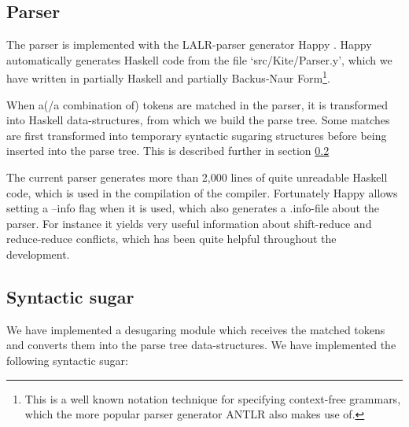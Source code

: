 \subsection{Parser}
The parser is implemented with the LALR-parser generator Happy \cite{marlow01}. Happy automatically generates Haskell code from the file `src/Kite/Parser.y', which we have written in partially Haskell and partially Backus-Naur Form\footnote{This is a well known notation technique for specifying context-free grammars, which the more popular parser generator ANTLR also makes use of.}.

When a(/a combination of) tokens are matched in the parser, it is transformed into Haskell data-structures, from which we build the parse tree. Some matches are first transformed into temporary syntactic sugaring structures before being inserted into the parse tree. This is described further in section \ref{sec:imp-sugar}

The current parser generates more than 2,000 lines of quite unreadable Haskell code, which is used in the compilation of the compiler. Fortunately Happy allows setting a --info flag when it is used, which also generates a .info-file about the parser. For instance it yields very useful information about shift-reduce and reduce-reduce conflicts, which has been quite helpful throughout the development.


\subsection{Syntactic sugar}
\label{sec:imp-sugar}
We have implemented a desugaring module which receives the matched tokens and converts them into the parse tree data-structures. We have implemented the following syntactic sugar:

